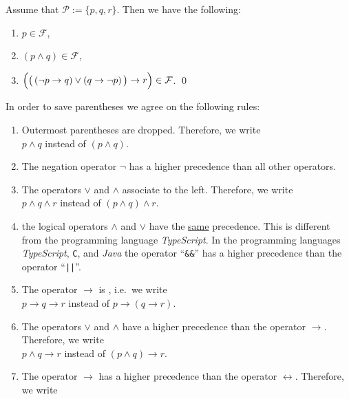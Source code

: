 \exampleEng 
Assume that $\mathcal{P} := \{ p, q, r \}$. Then we have the following:
\begin{enumerate}
\item $p \in \mathcal{F}$,
\item $(p \wedge q) \in \mathcal{F}$,
\item $\Bigl(\bigl(\,(\neg p \rightarrow q) \vee (q \rightarrow \neg p)\,\bigr) \rightarrow r\Bigr) \in \mathcal{F}$.  \qed
\end{enumerate}

\noindent
In order to save parentheses we agree on the following rules:
\begin{enumerate}
\item Outermost parentheses are dropped.  Therefore, we write \\[0.2cm]
      \hspace*{1.3cm} $p \wedge q$ \quad instead of \quad $(p \wedge q)$.
\item The negation operator $\neg$ has a higher precedence than all other operators. 
\item The operators  $\vee$ and $\wedge$ associate to the left.  Therefore, we write 
      \\[0.2cm]
      \hspace*{1.3cm} $p \wedge q \wedge r$ \quad instead of \quad $(p \wedge q) \wedge r$.
\item \underline{\textbf{}} the logical operators 
      $\wedge$ and $\vee$ have the \underline{same} precedence.  This is different from the programming
      language  \textsl{TypeScript}.  In the programming languages \textsl{TypeScript}, \texttt{C}, and
      \textsl{Java} the operator ``\texttt{\&\&}'' has a higher precedence than 
      the  operator ``\texttt{||}''.  
\item The operator $\rightarrow$ is \underline{}\underline{}, i.e.~we write \\[0.2cm]
      \hspace*{1.3cm} $p \rightarrow q \rightarrow r$ \quad instead of \quad $p \rightarrow (q \rightarrow r)$.
\item The operators  $\vee$ and $\wedge$ have a higher precedence than the operator $\rightarrow$.  Therefore,
      we write \\[0.2cm]
      \hspace*{1.3cm} $p \wedge q \rightarrow r$ \quad instead of \quad $(p \wedge q) \rightarrow r$.
\item The operator $\rightarrow$ has a higher precedence than the operator $\leftrightarrow$.  Therefore, we write \\[0.2cm]

\end{enumerate}
